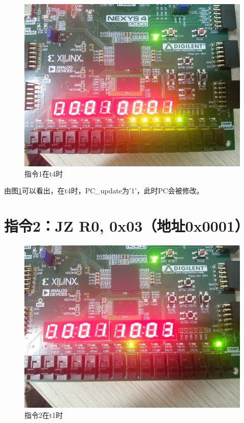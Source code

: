 \documentclass[forprint]{WHUBachelor}
\begin{document}
\begin{figure}[H]
  \centering
  \includegraphics[width=5in]{figures/download/03.jpg}
  \caption{指令1在t4时}
  \label{fig:down:03}
\end{figure}

由图\ref{fig:down:03}可以看出，在t4时，PC\_update为'1'，此时PC会被修改。

\section{指令2：JZ R0, 0x03（地址0x0001）}

\begin{figure}[H]
  \centering
  \includegraphics[width=5in]{figures/download/10.jpg}
  \caption{指令2在t1时}
  \label{fig:down:10}
\end{figure}
\end{document}
